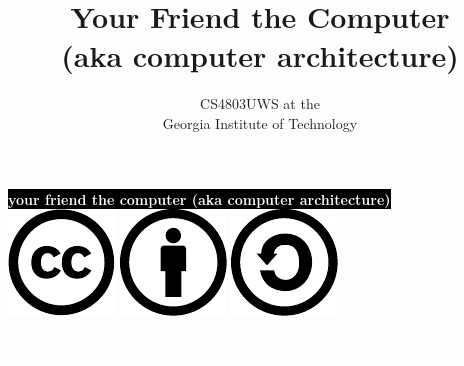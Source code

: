 \documentclass[mathserif,xcolor={dvipsnames,table}]{beamer}
\title{\textbf{Your Friend the Computer \\(aka computer architecture)}}
\date{}
\author{CS4803UWS at the\\
Georgia Institute of Technology
}
\begin{document}
{
%
\begin{frame}[plain]
\textcolor{white}{
%
\colorbox{black}{\textbf{your friend the computer (aka computer architecture)}}
}
\vspace{2.7in}
\\
\hfill\includegraphics[scale=.25]{images/cc-logo.pdf}
\includegraphics[scale=.25]{images/cc-new.pdf}
\includegraphics[scale=.25]{images/cc-share.pdf}
\textcolor{white}{
\\
\hfill \tiny{CC3.0 share-alike attribution}\\
}
\textcolor{white}{
\hfill \scriptsize{copyright \copyright\ 2013}\\
}
\end{frame}
}
\end{document}
